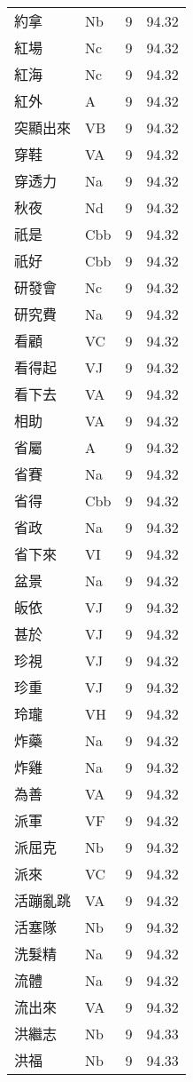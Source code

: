 \documentclass[twocolumn]{book}
\begin{document}
\begin{supertabular}{llrr}
約拿 & Nb & 9 &  94.32\\
紅場 & Nc & 9 &  94.32\\
紅海 & Nc & 9 &  94.32\\
紅外 & A & 9 &  94.32\\
突顯出來 & VB & 9 &  94.32\\
穿鞋 & VA & 9 &  94.32\\
穿透力 & Na & 9 &  94.32\\
秋夜 & Nd & 9 &  94.32\\
祇是 & Cbb & 9 &  94.32\\
祇好 & Cbb & 9 &  94.32\\
研發會 & Nc & 9 &  94.32\\
研究費 & Na & 9 &  94.32\\
看顧 & VC & 9 &  94.32\\
看得起 & VJ & 9 &  94.32\\
看下去 & VA & 9 &  94.32\\
相助 & VA & 9 &  94.32\\
省屬 & A & 9 &  94.32\\
省賽 & Na & 9 &  94.32\\
省得 & Cbb & 9 &  94.32\\
省政 & Na & 9 &  94.32\\
省下來 & VI & 9 &  94.32\\
盆景 & Na & 9 &  94.32\\
皈依 & VJ & 9 &  94.32\\
甚於 & VJ & 9 &  94.32\\
珍視 & VJ & 9 &  94.32\\
珍重 & VJ & 9 &  94.32\\
玲瓏 & VH & 9 &  94.32\\
炸藥 & Na & 9 &  94.32\\
炸雞 & Na & 9 &  94.32\\
為善 & VA & 9 &  94.32\\
派軍 & VF & 9 &  94.32\\
派屈克 & Nb & 9 &  94.32\\
派來 & VC & 9 &  94.32\\
活蹦亂跳 & VA & 9 &  94.32\\
活塞隊 & Nb & 9 &  94.32\\
洗髮精 & Na & 9 &  94.32\\
流體 & Na & 9 &  94.32\\
流出來 & VA & 9 &  94.32\\
洪繼志 & Nb & 9 &  94.33\\
洪福 & Nb & 9 &  94.33\\

\end{supertabular}
\end{document}
